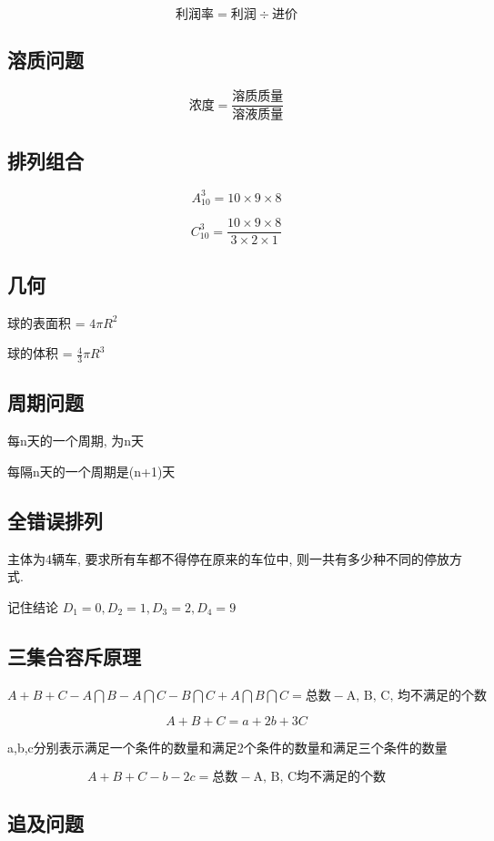 \documentclass[UTF8]{ctexart}
\begin{document}
$$
	\mbox{利润率} = \mbox{利润} \div \mbox{进价}
$$

\subsection{溶质问题}
$$
	\mbox{浓度}=\frac{\mbox{溶质质量}}{\mbox{溶液质量}}
$$

\subsection{排列组合}
$$
	A^{3}_{10} = 10 \times 9 \times 8
$$

$$
	C^{3}_{10} = \frac{10 \times 9 \times 8}{3 \times 2 \times 1}
$$

\subsection{几何}

球的表面积 = $4\pi R^2$

球的体积 = $\frac{4}{3} \pi R^3$

\subsection{周期问题}
每n天的一个周期, 为n天

每隔n天的一个周期是(n+1)天




\subsection{全错误排列}

主体为4辆车, 要求所有车都不得停在原来的车位中, 则一共有多少种不同的停放方式.

记住结论 $D_1 = 0, D_2 = 1, D_3 = 2, D_4 = 9$


\subsection{三集合容斥原理}

$A + B + C - A\bigcap B - A \bigcap C - B \bigcap C + A \bigcap B \bigcap C = \mbox{总数} - \mbox{A, B, C, 均不满足的个数} $

$$A + B + C = a + 2b + 3C$$

a,b,c分别表示满足一个条件的数量和满足2个条件的数量和满足三个条件的数量

$$
	A + B + C - b - 2c = \mbox{总数} - \mbox{A, B, C均不满足的个数}
$$


\subsection{追及问题}
\end{document}
